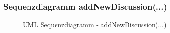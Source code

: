 \documentclass[11pt,ngerman]{article}
\begin{document}
        \subsubsection{Sequenzdiagramm addNewDiscussion(...)}
        \label{sssec:Sequenzdiagramm_addNewDiscussion}
        \begin{figure}[H]
            \centering
            \caption{UML Sequenzdiagramm - addNewDiscussion(...)}
            \label{fig:Sequenzdiagramm_addNewDiscussion}
        \end{figure}
\end{document}
